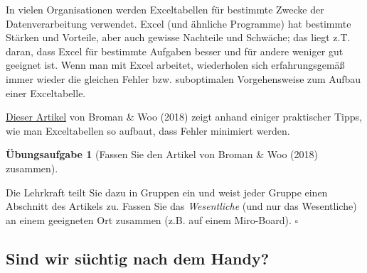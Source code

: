 \documentclass[
  a4paper,
]{scrbook}
\theoremstyle{definition}
\theoremstyle{definition}
\theoremstyle{definition}
\newtheorem{exercise}{Übungsaufgabe}[chapter]
\theoremstyle{remark}
\begin{document}
In vielen Organisationen werden Exceltabellen für bestimmte Zwecke der
Datenverarbeitung verwendet. Excel (und ähnliche Programme) hat
bestimmte Stärken und Vorteile, aber auch gewisse Nachteile und
Schwäche; das liegt z.T. daran, dass Excel für bestimmte Aufgaben besser
und für andere weniger gut geeignet ist. Wenn man mit Excel arbeitet,
wiederholen sich erfahrungsgemäß immer wieder die gleichen Fehler bzw.
suboptimalen Vorgehensweise zum Aufbau einer Exceltabelle.

\href{https://www.tandfonline.com/doi/full/10.1080/00031305.2017.1375989}{Dieser
Artikel} von Broman \& Woo (2018) zeigt anhand einiger praktischer
Tipps, wie man Exceltabellen so aufbaut, dass Fehler minimiert werden.

\begin{exercise}[Fassen Sie den Artikel von Broman \& Woo (2018)
zusammen]\protect\hypertarget{exr-xls-paper}{}\label{exr-xls-paper}

Die Lehrkraft teilt Sie dazu in Gruppen ein und weist jeder Gruppe einen
Abschnitt des Artikels zu. Fassen Sie das \emph{Wesentliche} (und nur
das Wesentliche) an einem geeigneten Ort zusammen (z.B. auf einem
Miro-Board). \(\square\)

\end{exercise}

\subsection{Sind wir süchtig nach dem
Handy?}\label{sind-wir-suxfcchtig-nach-dem-handy}
\end{document}
